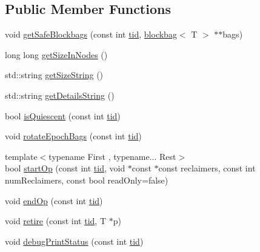 \subsection*{Public Member Functions}
\begin{DoxyCompactItemize}
\item 
void \hyperlink{classreclaimer__ebr__token_ae2fee48a5fa6b5e1626a5f5c98eb111b}{get\+Safe\+Blockbags} (const int \hyperlink{microbench_2main_8cpp_a9ca9869868fe7e7a38a921cc7de4103f}{tid}, \hyperlink{classblockbag}{blockbag}$<$ T $>$ $\ast$$\ast$bags)
\item 
long long \hyperlink{classreclaimer__ebr__token_aea32a21f3af9b3491ae008ef7166fcbc}{get\+Size\+In\+Nodes} ()
\item 
std\+::string \hyperlink{classreclaimer__ebr__token_a2375bf4a808710a12e7f0e5c598c92b3}{get\+Size\+String} ()
\item 
std\+::string \hyperlink{classreclaimer__ebr__token_a1eba9df1d95ccd1163c53697c37afc83}{get\+Details\+String} ()
\item 
bool \hyperlink{classreclaimer__ebr__token_a7cd87fdf1ae24baad3bfb808f329a57a}{is\+Quiescent} (const int \hyperlink{microbench_2main_8cpp_a9ca9869868fe7e7a38a921cc7de4103f}{tid})
\item 
void \hyperlink{classreclaimer__ebr__token_a36bc96f3000460deab02e93a24e137fa}{rotate\+Epoch\+Bags} (const int \hyperlink{microbench_2main_8cpp_a9ca9869868fe7e7a38a921cc7de4103f}{tid})
\item 
{\footnotesize template$<$typename First , typename... Rest$>$ }\\bool \hyperlink{classreclaimer__ebr__token_ae945b650a83590e6973db21404a2fb6a}{start\+Op} (const int \hyperlink{microbench_2main_8cpp_a9ca9869868fe7e7a38a921cc7de4103f}{tid}, void $\ast$const $\ast$const reclaimers, const int num\+Reclaimers, const bool read\+Only=false)
\item 
void \hyperlink{classreclaimer__ebr__token_abda33f89a0c09967d630e4e4b5ee83a4}{end\+Op} (const int \hyperlink{microbench_2main_8cpp_a9ca9869868fe7e7a38a921cc7de4103f}{tid})
\item 
void \hyperlink{classreclaimer__ebr__token_a179176c408edeb99d0c03dfe8852fea0}{retire} (const int \hyperlink{microbench_2main_8cpp_a9ca9869868fe7e7a38a921cc7de4103f}{tid}, T $\ast$p)
\item 
void \hyperlink{classreclaimer__ebr__token_a53348d44f753066411772dfae552f77f}{debug\+Print\+Status} (const int \hyperlink{microbench_2main_8cpp_a9ca9869868fe7e7a38a921cc7de4103f}{tid})
\item 
$$
\end{DoxyCompactItemize}
